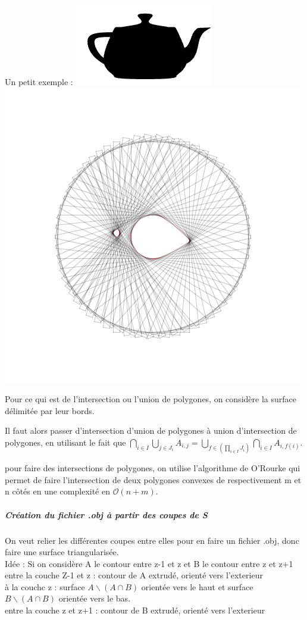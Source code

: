 \documentclass{article}
\begin{document}
Un petit exemple : \includegraphics[scale=0.5]{14}\includegraphics[scale=0.25]{13}

Pour ce qui est de l'intersection ou l'union de polygones, on considère
la surface délimitée par leur bords.

Il faut alors passer d'intersection d'union de polygones à union d'intersection
de polygones, en utilisant le fait que $\bigcap_{i\in I}\bigcup_{j\in J_{i}}A_{i,j}=\bigcup_{f\in(\prod_{i\in I}J_{i})}\bigcap_{i\in I}A_{i,f(i)}$.

pour faire des intersections de polygones, on utilise l'algorithme
de O'Rourke \cite{key-1} qui permet de faire l'intersection de deux
polygones convexes de respectivement m et n côtés en une complexité
en $\mathcal{O}(n+m)$.

\subparagraph{Création du fichier .obj à partir des coupes de S}

On veut relier les différentes coupes entre elles pour en faire un
fichier .obj, donc faire une surface triangularisée.\\
Idée : Si on considère A le contour entre z-1 et z et B le contour entre z et z+1\\
entre la couche Z-1 et z : contour de A extrudé, orienté vers l'exterieur\\
à la couchc z : surface $A\backslash (A\cap B)$ orientée vers le haut et surface $B\backslash (A\cap B)$ orientée vers le bas.\\
entre la couche z et z+1 : contour de B extrudé, orienté vers l'exterieur\\
\end{document}
